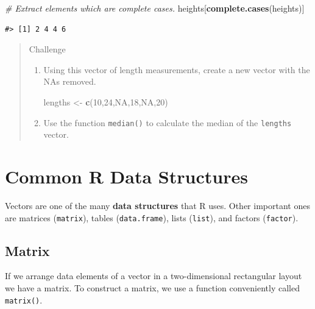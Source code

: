 \documentclass[
]{book}
\newenvironment{Shaded}{\begin{snugshade}}{\end{snugshade}}
\newcommand{\CommentTok}[1]{\textcolor[rgb]{0.56,0.35,0.01}{\textit{#1}}}
\newcommand{\DecValTok}[1]{\textcolor[rgb]{0.00,0.00,0.81}{#1}}
\newcommand{\KeywordTok}[1]{\textcolor[rgb]{0.13,0.29,0.53}{\textbf{#1}}}
\newcommand{\NormalTok}[1]{#1}
\newcommand{\OtherTok}[1]{\textcolor[rgb]{0.56,0.35,0.01}{#1}}
\newcommand{\StringTok}[1]{\textcolor[rgb]{0.31,0.60,0.02}{#1}}
\begin{document}
\begin{Shaded}
\begin{Highlighting}[]
\CommentTok{# Extract elements which are complete cases.}
\NormalTok{heights[}\KeywordTok{complete.cases}\NormalTok{(heights)]}
\end{Highlighting}
\end{Shaded}

\begin{verbatim}
#> [1] 2 4 4 6
\end{verbatim}

\begin{quote}
Challenge

\begin{enumerate}
\def\labelenumi{\arabic{enumi}.}
\item
  Using this vector of length measurements, create a new vector with the NAs
  removed.

\begin{Shaded}
\begin{Highlighting}[]
\NormalTok{lengths <-}\StringTok{ }\KeywordTok{c}\NormalTok{(}\DecValTok{10}\NormalTok{,}\DecValTok{24}\NormalTok{,}\OtherTok{NA}\NormalTok{,}\DecValTok{18}\NormalTok{,}\OtherTok{NA}\NormalTok{,}\DecValTok{20}\NormalTok{)}
\end{Highlighting}
\end{Shaded}
\item
  Use the function \texttt{median()} to calculate the median of the \texttt{lengths} vector.
\end{enumerate}
\end{quote}

\hypertarget{common-r-data-structures}{%
\section{Common R Data Structures}\label{common-r-data-structures}}

Vectors are one of the many \textbf{data structures} that R uses. Other important
ones are matrices (\texttt{matrix}), tables (\texttt{data.frame}), lists (\texttt{list}), and
factors (\texttt{factor}).

\hypertarget{matrix}{%
\subsection{Matrix}\label{matrix}}

If we arrange data elements of a vector in a two-dimensional rectangular layout we have a matrix. To construct a matrix, we use a function conveniently called \texttt{matrix()}.
\end{document}
